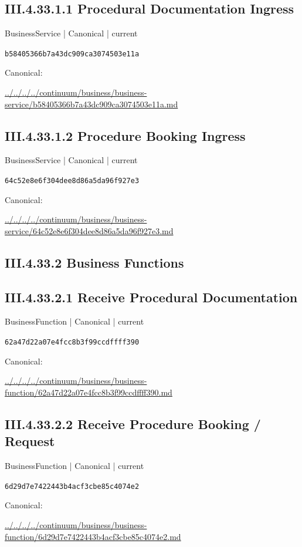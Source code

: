 \documentclass[10pt,a4paper]{article}
\begin{document}
\subsection*{III.4.33.1.1 Procedural Documentation Ingress}
{\small BusinessService | Canonical | current}\par
\texttt{b58405366b7a43dc909ca3074503e11a}\par
Canonical: \par
{\footnotesize\url{../../../../continuum/business/business-service/b58405366b7a43dc909ca3074503e11a.md}}\par
\subsection*{III.4.33.1.2 Procedure Booking Ingress}
{\small BusinessService | Canonical | current}\par
\texttt{64c52e8e6f304dee8d86a5da96f927e3}\par
Canonical: \par
{\footnotesize\url{../../../../continuum/business/business-service/64c52e8e6f304dee8d86a5da96f927e3.md}}\par
\subsection*{III.4.33.2 Business Functions}
\subsection*{III.4.33.2.1 Receive Procedural Documentation}
{\small BusinessFunction | Canonical | current}\par
\texttt{62a47d22a07e4fcc8b3f99ccdffff390}\par
Canonical: \par
{\footnotesize\url{../../../../continuum/business/business-function/62a47d22a07e4fcc8b3f99ccdffff390.md}}\par
\subsection*{III.4.33.2.2 Receive Procedure Booking / Request}
{\small BusinessFunction | Canonical | current}\par
\texttt{6d29d7e7422443b4acf3cbe85c4074e2}\par
Canonical: \par
{\footnotesize\url{../../../../continuum/business/business-function/6d29d7e7422443b4acf3cbe85c4074e2.md}}\par
\end{document}
